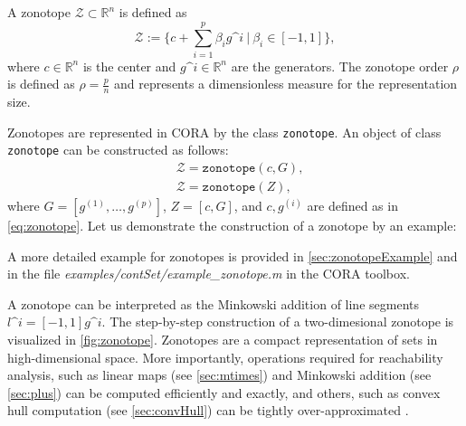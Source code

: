  \label{sec:zonotope}

A zonotope $\mathcal{Z} \subset \mathbb{R}^n$ is defined as
\begin{equation} \label{eq:zonotope}
\mathcal{Z} := \bigg \{ c + \sum_{i=1}^{p} \beta_i g\^{i} ~\bigg|~ \beta_i \in [-1,1] \bigg\},
\end{equation}
where $c \in \mathbb{R}^n$ is the center and $g\^i \in \mathbb{R}^n$ are the generators. The zonotope order $\rho$ is defined as $\rho = \frac{p}{n}$ and represents a dimensionless measure for the representation size.

Zonotopes are represented in CORA by the class \texttt{zonotope}. An object of class \texttt{zonotope} can be constructed as follows:
\begin{equation*}
	\begin{split}
		& \mathcal{Z} = \texttt{zonotope}(c,G), \\
		& \mathcal{Z} = \texttt{zonotope}(Z),
	\end{split}
\end{equation*} 
where $G= [g^{(1)},\dots,g^{(p)}]$, $Z = [c,G]$, and $c,g^{(i)}$ are defined as in \eqref{eq:zonotope}. Let us demonstrate the construction of a zonotope by an example:

\begin{center}
\begin{minipage}[t]{0.35\textwidth}
	\vspace{20pt}
	\footnotesize
	
\end{minipage}
\begin{minipage}[t]{0.3\textwidth}
	\vspace{0pt}
	\centering
\end{minipage}
\end{center}

A more detailed example for zonotopes is provided in \cref{sec:zonotopeExample} and in the file \textit{examples/contSet/example\_zonotope.m} in the CORA toolbox.

A zonotope can be interpreted as the Minkowski addition of line segments $l\^i = [-1,1]g\^{i}$. The step-by-step construction of a two-dimesional zonotope is visualized in \cref{fig:zonotope}. Zonotopes are a compact representation of sets in high-dimensional space. More importantly, operations required for reachability analysis, such as linear maps (see \cref{sec:mtimes}) and Minkowski addition (see \cref{sec:plus}) can be computed efficiently and exactly, and others, such as convex hull computation (see \cref{sec:convHull}) can be tightly over-approximated \cite{Girard2005}.

